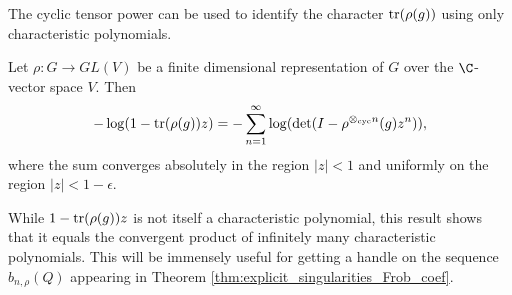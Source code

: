 \documentclass[12pt]{amsart}
\theoremstyle{plain}
\begin{document}
The cyclic tensor power can be used to identify the character ${\rm tr}(\rho(g))$ using only characteristic polynomials.

\begin{theorem}\label{thm:log_trchar}
Let $\rho:G\to GL(V)$ be a finite dimensional representation of $G$ over the $\C$-vector space $V$. Then
\[
-\log( 1 - {\rm tr}(\rho(g))z ) = -\sum_{n=1}^{\infty}\log(\det(I-\rho^{\otimes_{\text{cyc}} n}(g)z^n)),
\]
where the sum converges absolutely in the region $|z|<1$ and uniformly on the region $|z|<1-\epsilon$.
\end{theorem}

While $1-{\rm tr}(\rho(g))z$ is not itself a characteristic polynomial, this result shows that it equals the convergent product of infinitely many characteristic polynomials. This will be immensely useful for getting a handle on the sequence $b_{n,\rho}(Q)$ appearing in Theorem \ref{thm:explicit_singularities_Frob_coef}.
\end{document}
